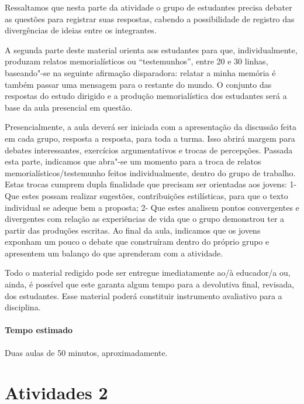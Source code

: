 \documentclass[11pt]{extarticle}
\begin{document}

Ressaltamos que nesta parte da atividade o
grupo de estudantes precisa debater as questões para registrar suas
respostas, cabendo a possibilidade de registro das divergências de
ideias entre os integrantes.

A segunda parte deste material orienta aos estudantes para que,
individualmente, produzam relatos memorialísticos ou ``testemunhos'',
entre 20 e 30 linhas, baseando"-se na seguinte afirmação disparadora:
relatar a minha memória é também passar uma mensagem para o restante do
mundo. O conjunto das respostas do estudo dirigido e a produção
memorialística dos estudantes será a base da aula presencial em questão.

Presencialmente, a aula deverá ser iniciada com a apresentação da
discussão feita em cada grupo, resposta a resposta, para toda a turma.
Isso abrirá margem para debates interessantes, exercícios argumentativos
e trocas de percepções. Passada esta parte, indicamos que abra"-se um
momento para a troca de relatos memorialísticos/testemunho feitos
individualmente, dentro do grupo de trabalho. Estas trocas cumprem dupla
finalidade que precisam ser orientadas aos jovens: 1- Que estes possam
realizar sugestões, contribuições estilísticas, para que o texto
individual se adeque bem a proposta; 2- Que estes analisem pontos
convergentes e divergentes com relação as experiências de vida que o
grupo demonstrou ter a partir das produções escritas. Ao final da aula,
indicamos que os jovens exponham um pouco o debate que construíram
dentro do próprio grupo e apresentem um balanço do que aprenderam com a
atividade.

Todo o material redigido pode ser entregue imediatamente ao/à educador/a
ou, ainda, é possível que este garanta algum tempo para a devolutiva
final, revisada, dos estudantes. Esse material poderá constituir
instrumento avaliativo para a disciplina.

\paragraph{Tempo estimado} Duas aulas de 50 minutos, aproximadamente.


\section{Atividades 2}

\end{document}
